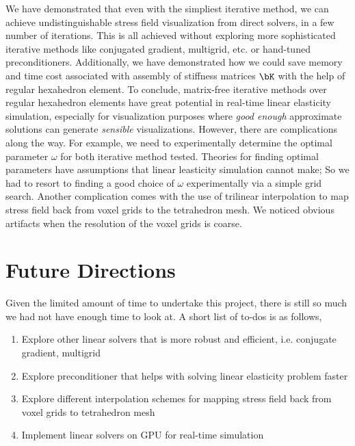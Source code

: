 \documentclass[11pt,titlepage]{article}
\begin{document}
We have demonstrated that even with the simpliest iterative method, we can achieve undistinguishable stress field visualization from direct solvers, in a few number of iterations. This is all achieved without exploring more sophisticated iterative methods like conjugated gradient, multigrid, etc. or hand-tuned preconditioners. Additionally, we have demonstrated how we could save memory and time cost associated with assembly of stiffness matrices $\bK$ with the help of regular hexahedron element. To conclude, matrix-free iterative methods over regular hexahedron elements have great potential in real-time linear elasticity simulation, especially for visualization purposes where \textit{good enough} approximate solutions can generate \textit{sensible} visualizations.
However, there are complications along the way. For example, we need to experimentally determine the optimal parameter $\omega$ for both iterative method tested. Theories for finding optimal parameters have assumptions that linear leasticity simulation cannot make; So we had to resort to finding a good choice of $\omega$ experimentally via a simple grid search. Another complication comes with the use of trilinear interpolation to map stress field back from voxel grids to the tetrahedron mesh. We noticed obvious artifacts when the resolution of the voxel grids is coarse.

\section{Future Directions}

Given the limited amount of time to undertake this project, there is still so much we had not have enough time to look at. A short list of to-dos is as follows,
\begin{enumerate}
    \item Explore other linear solvers that is more robust and efficient, i.e. conjugate gradient, multigrid
    \item Explore preconditioner that helps with solving linear elasticity problem faster
    \item Explore different interpolation schemes for mapping stress field back from voxel grids to tetrahedron mesh
    \item Implement linear solvers on GPU for real-time simulation
\end{enumerate}


\newpage
\printbibliography
\end{document}
